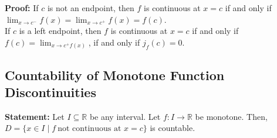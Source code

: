 \documentclass[10pt]{extarticle}
\newcommand{\R}{\mathbb{R}}
\begin{document}
    \textbf{Proof:} If $c$ is not an endpoint, then $f$ is continuous at $x=c$ if and only if $\lim_{x\rightarrow c^{-}}f(x) = \lim_{x\rightarrow c^{+}} f(x) = f(c) $.\\

    If $c$ is a left endpoint, then $f$ is continuous at $x=c$ if and only if $f(c) = \lim_{x\rightarrow c^{+}f(x)}$, if and only if $j_f(c) = 0$.
  \subsection{Countability of Monotone Function Discontinuities}%
  \textbf{Statement:} Let $I\subseteq \R$ be any interval. Let $f: I\rightarrow \R$ be monotone. Then, $D = \{x\in I\mid f~\text{not continuous at }x=c\}$ is countable.\\
\end{document}
